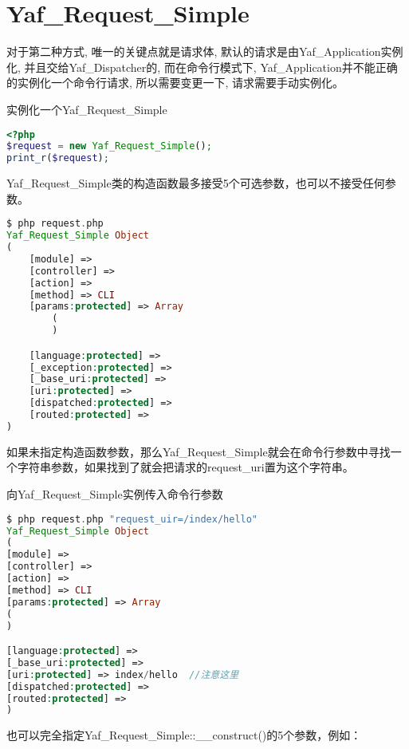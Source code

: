 \section{Yaf\_Request\_Simple}


对于第二种方式, 唯一的关键点就是请求体, 默认的请求是由Yaf\_Application实例化, 并且交给Yaf\_Dispatcher的, 而在命令行模式下, Yaf\_Application并不能正确的实例化一个命令行请求, 所以需要变更一下, 请求需要手动实例化。

\begin{example}
实例化一个Yaf\_Request\_Simple
\begin{lstlisting}[language=PHP]
<?php
$request = new Yaf_Request_Simple();
print_r($request);
\end{lstlisting}
\end{example}

Yaf\_Request\_Simple类的构造函数最多接受5个可选参数，也可以不接受任何参数。


\begin{lstlisting}[language=PHP]
$ php request.php
Yaf_Request_Simple Object
(
    [module] => 
    [controller] => 
    [action] => 
    [method] => CLI
    [params:protected] => Array
        (
        )

    [language:protected] => 
    [_exception:protected] => 
    [_base_uri:protected] => 
    [uri:protected] => 
    [dispatched:protected] => 
    [routed:protected] => 
)
\end{lstlisting}



如果未指定构造函数参数，那么Yaf\_Request\_Simple就会在命令行参数中寻找一个字符串参数，如果找到了就会把请求的request\_uri置为这个字符串。


\begin{example}
向Yaf\_Request\_Simple实例传入命令行参数
\begin{lstlisting}[language=PHP]
$ php request.php "request_uir=/index/hello"
Yaf_Request_Simple Object
(
[module] =>
[controller] =>
[action] =>
[method] => CLI
[params:protected] => Array
(
)

[language:protected] =>
[_base_uri:protected] =>
[uri:protected] => index/hello  //注意这里
[dispatched:protected] =>
[routed:protected] =>
)
\end{lstlisting}
\end{example}





也可以完全指定Yaf\_Request\_Simple::\_\_construct()的5个参数，例如：

